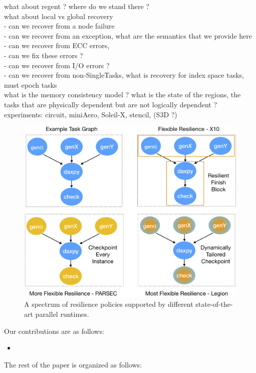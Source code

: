 what about regent ? where do we stand there ?\\

what about local vs global recovery\\
	- can we recover from a node failure\\
	- can we recover from an exception, what are the semantics that we provide
	  here\\
	- can we recover from ECC errors, \\
	- can we fix these errors ?\\
	- can we recover from I/O errors ?\\ 
	- can we recover from non-SingleTasks, what is recovery for index space
	  tasks, must epoch tasks\\

what is the memory consistency model ? what is the state of the regions, the
tasks that are physically dependent but are not logically dependent ?\\
	

experiments: circuit, miniAero, Soleil-X, stencil, (S3D ?)\\

\begin{figure}
\includegraphics[width=.40\textwidth]{images/spectrum_x10_parsec_legion_policies.png}
\caption{A spectrum of resilience policies supported by different state-of-the-art parallel runtimes.}
\end{figure}

Our contributions are as follows:
\begin{itemize}
\item 
\end{itemize}


The rest of the paper is organized as follows:
